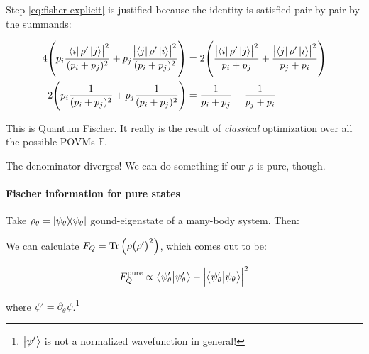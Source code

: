 \documentclass[main.tex]{subfiles}
\begin{document}
Step \eqref{eq:fisher-explicit} is justified because the identity is satisfied pair-by-pair by the summands:

\begin{subequations}
\begin{align}
  4\qty(p_i\frac{\abs{\bra{i} \rho' \ket{j}}^2 }{(p_i + p_j)^2} +
  p_j\frac{\abs{\bra{j} \rho' \ket{i}}^2 }{(p_i + p_j)^2}) &=
  2 \qty(\frac{\abs{\bra{i} \rho' \ket{j}}^2 }{p_i + p_j} +
  \frac{\abs{\bra{j} \rho' \ket{i}}^2 }{p_j + p_i} ) \\
  2\qty(p_i\frac{1 }{(p_i + p_j)^2} +
  p_j\frac{ 1}{(p_i + p_j)^2}) &=
  \frac{1 }{p_i + p_j} +
  \frac{ 1}{p_j + p_i}
\end{align}
\end{subequations}

This is Quantum Fischer. It really is the result of \emph{classical} optimization over all the possible POVMs \(\mathbb{E}\).

The denominator diverges! We can do something if our \(\rho\) is pure, though.

\paragraph{Fischer information for pure states}

Take \( \rho_\theta = \ketbra{\psi_\theta} \) gound-eigenstate of a many-body system. Then:

\begin{claim}
We can calculate  \( F_Q =  \operatorname*{Tr} \qty(\rho \qty(\rho')^2)\), which comes out to be:

\begin{equation}
F_Q ^{\text{pure}} \propto \braket{\psi_\theta'}{\psi_\theta'} - \abs{\braket{\psi_\theta'}{\psi_\theta}}^2
\end{equation}

where \( \psi' = \partial_\theta \psi \).\footnote{\(\ket{\psi'}\) is not a normalized wavefunction in general!}
\end{claim}
\end{document}
